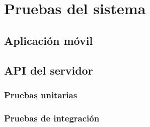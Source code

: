 \chapter{Pruebas del sistema}
\label{chapter:pruebas}
    \section{Aplicación móvil}
    \section{API del servidor}
        \subsection{Pruebas unitarias}
        \subsection{Pruebas de integración}
